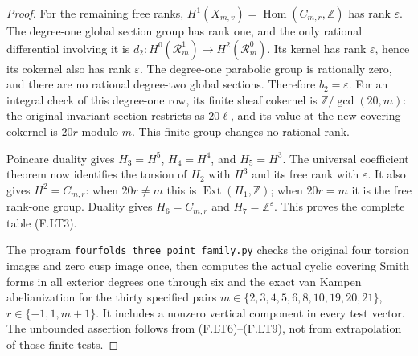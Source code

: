 \begin{proof}
For the remaining free ranks,
$H^1(X_{m,v})=\operatorname{Hom}(C_{m,r},\mathbb Z)$
has rank $\varepsilon$.
The degree-one global section group has rank one,
and the only rational differential involving it is
$d_2:H^0(\mathcal R_m^1)\to H^2(\mathcal R_m^0)$.
Its kernel has rank $\varepsilon$, hence its
cokernel also has rank $\varepsilon$.
The degree-one parabolic group is rationally zero,
and there are no rational degree-two global sections.
Therefore $b_2=\varepsilon$.
For an integral check of this degree-one row, its
finite sheaf cokernel is
$\mathbb Z/\gcd(20,m)$: the original invariant
section restricts as $20\ell$, and its value at
the new covering cokernel is $20r$ modulo $m$.
This finite group changes no rational rank.

Poincare duality gives
$H_3=H^5$, $H_4=H^4$, and $H_5=H^3$.
The universal coefficient theorem now identifies
the torsion of $H_2$ with $H^3$ and its free rank
with $\varepsilon$.
It also gives $H^2=C_{m,r}$: when $20r\ne m$ this
is $\operatorname{Ext}(H_1,\mathbb Z)$; when
$20r=m$ it is the free rank-one group.
Duality gives $H_6=C_{m,r}$ and
$H_7=\mathbb Z^\varepsilon$.
This proves the complete table (F.LT3).

The program \texttt{fourfolds\_three\_point\_family.py}
checks the original four torsion images and zero
cusp image once, then computes the actual cyclic
covering Smith forms in all exterior degrees one
through six and the exact van Kampen abelianization
for the thirty specified pairs
$m\in\{2,3,4,5,6,8,10,19,20,21\}$,
$r\in\{-1,1,m+1\}$.
It includes a nonzero vertical component in every
test vector.
The unbounded assertion follows from (F.LT6)--(F.LT9),
not from extrapolation of those finite tests.
\end{proof}
